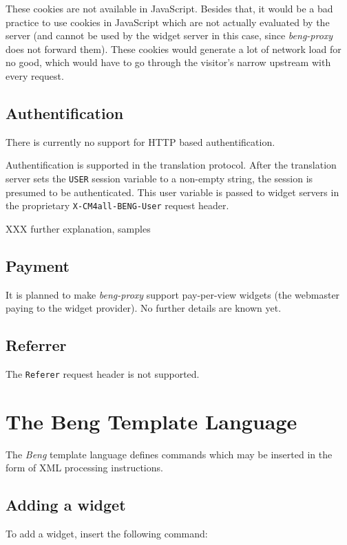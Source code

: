 \documentclass[a4paper,12pt]{article}
\begin{document}
These cookies are not available in JavaScript.  Besides that, it would
be a bad practice to use cookies in JavaScript which are not actually
evaluated by the server (and cannot be used by the widget server in
this case, since \emph{beng-proxy} does not forward them).  These
cookies would generate a lot of network load for no good, which would
have to go through the visitor's narrow upstream with every request.

\subsection{Authentification}

There is currently no support for HTTP based authentification.

Authentification is supported in the translation protocol.  After the
translation server sets the \texttt{USER} session variable to a
non-empty string, the session is presumed to be authenticated.  This
user variable is passed to widget servers in the proprietary
\texttt{X-CM4all-BENG-User} request header.

XXX further explanation, samples


\subsection{Payment}

It is planned to make \emph{beng-proxy} support pay-per-view widgets
(the webmaster paying to the widget provider).  No further details are
known yet.


\subsection{Referrer}

The \texttt{Referer} request header is not supported.


\section{The Beng Template Language}
\label{processor}

The \emph{Beng} template language defines commands which may be
inserted in the form of XML processing instructions.

\subsection{Adding a widget}

To add a widget, insert the following command:
\end{document}
